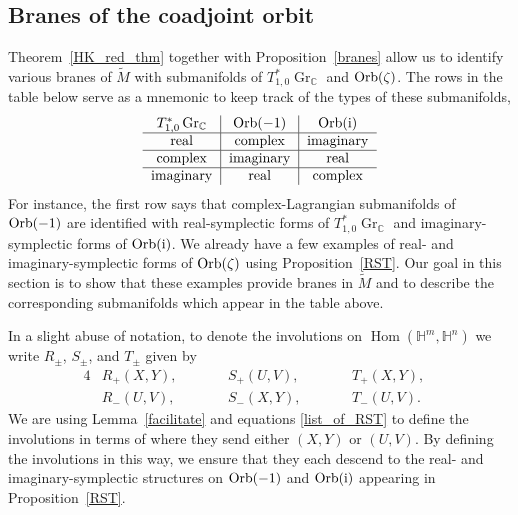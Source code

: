 \documentclass[pdftex]{sigma}
\numberwithin{equation}{section}
\DeclareMathOperator{\Hom}{Hom}
\DeclareMathOperator{\Gr}{Gr}
\newcommand{\C}{\mathbb{C}}
\newcommand{\Q}{\mathbb{H}}
\begin{document}
\subsection{Branes of the coadjoint orbit}
Theorem~\ref{HK_red_thm} together with Proposition~\ref{branes} allow us to identify various branes of $\tilde{M}$ with submanifolds of $T^*_{1,0}\Gr_\C$ and ${\rm Orb}(\zeta)$. The rows in the table below serve as a mnemonic to keep track of the types of these submanifolds,
\begin{equation}\label{little_table}
	\begin{tabular}{c|c|c}
		$T^*_{1,0}\Gr_\C$ & ${\rm Orb}(-1)$ & ${\rm Orb}({\rm i})$\\\hline
		\text{real} & complex & imaginary \\\hline
		complex & imaginary & real \\\hline
		imaginary & real & complex
	\end{tabular}
\end{equation}
For instance, the first row says that complex-Lagrangian submanifolds of ${\rm Orb}(-1)$ are identified with real-symplectic forms of $T^*_{1,0}\Gr_\C$ and imaginary-symplectic forms of ${\rm Orb}({\rm i})$. We already have a few examples of real- and imaginary-symplectic forms of ${\rm Orb}(\zeta)$ using Proposition~\ref{RST}. Our goal in this section is to show that these examples provide branes in $\tilde{M}$ and to describe the corresponding submanifolds which appear in the table above.

In a slight abuse of notation, to denote the involutions on $\Hom(\Q^m,\Q^n)$ we write $R_\pm$, $S_\pm$, and $T_\pm$ given by
\begin{alignat*}{4}
	&R_+(X,Y),\qquad &&S_+(U,V),\qquad &&T_+(X,Y),&\\
	&R_-(U,V),\qquad &&S_-(X,Y),\qquad &&T_-(U,V).&
\end{alignat*}
We are using Lemma~\ref{facilitate} and equations \eqref{list_of_RST} to define the involutions in terms of where they send either $(X,Y)$ or $(U,V)$. By defining the involutions in this way, we ensure that they each descend to the real- and imaginary-symplectic structures on ${\rm Orb}(-1)$ and ${\rm Orb}({\rm i})$ appearing in Proposition~\ref{RST}.
\end{document}

